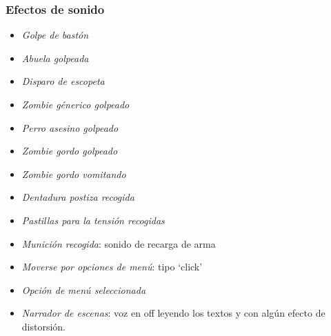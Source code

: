 \documentclass[titlepage]{article}
\begin{document}
\subsubsection{Efectos de sonido}
\begin{itemize}
	\item \emph{Golpe de bastón}
	\item \emph{Abuela golpeada}
	\item \emph{Disparo de escopeta}
	\item \emph{Zombie génerico golpeado}
	\item \emph{Perro asesino golpeado}
	\item \emph{Zombie gordo golpeado}
	\item \emph{Zombie gordo vomitando}
	\item \emph{Dentadura postiza recogida}
	\item \emph{Pastillas para la tensión recogidas}
	\item \emph{Munición recogida}: sonido de recarga de arma
	\item \emph{Moverse por opciones de menú}: tipo `click'
	\item \emph{Opción de menú seleccionada}
	\item \emph{Narrador de escenas}: voz en off leyendo los textos y con algún efecto de distorsión.
\end{itemize}
\end{document}
